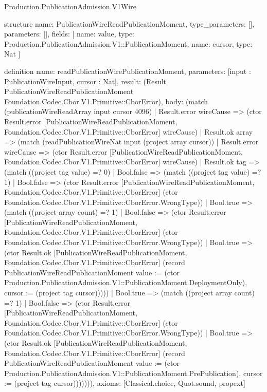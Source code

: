 \begin{lexlean}{Production.PublicationAdmission.V1Wire}
\begin{semanticmodule}
structure{
  name: PublicationWireReadPublicationMoment,
  type_parameters: [],
  parameters: [],
  fields: [
    {name: value, type: Production.PublicationAdmission.V1::PublicationMoment},
    {name: cursor, type: Nat}
  ]
}

definition{
  name: readPublicationWirePublicationMoment,
  parameters: [input : PublicationWireInput, cursor : Nat],
  result: (Result PublicationWireReadPublicationMoment Foundation.Codec.Cbor.V1.Primitive::CborError),
  body: (match (publicationWireReadArray input cursor 4096)
    | Result.error wireCause => (ctor Result.error [PublicationWireReadPublicationMoment, Foundation.Codec.Cbor.V1.Primitive::CborError] wireCause)
    | Result.ok array => (match (readPublicationWireNat input (project array cursor))
      | Result.error wireCause => (ctor Result.error [PublicationWireReadPublicationMoment, Foundation.Codec.Cbor.V1.Primitive::CborError] wireCause)
      | Result.ok tag => (match ((project tag value) =? 0)
        | Bool.false => (match ((project tag value) =? 1)
          | Bool.false => (ctor Result.error [PublicationWireReadPublicationMoment, Foundation.Codec.Cbor.V1.Primitive::CborError] (ctor Foundation.Codec.Cbor.V1.Primitive::CborError.WrongType))
          | Bool.true => (match ((project array count) =? 1)
            | Bool.false => (ctor Result.error [PublicationWireReadPublicationMoment, Foundation.Codec.Cbor.V1.Primitive::CborError] (ctor Foundation.Codec.Cbor.V1.Primitive::CborError.WrongType))
            | Bool.true => (ctor Result.ok [PublicationWireReadPublicationMoment, Foundation.Codec.Cbor.V1.Primitive::CborError] (record PublicationWireReadPublicationMoment {value := (ctor Production.PublicationAdmission.V1::PublicationMoment.DeploymentOnly), cursor := (project tag cursor)}))))
        | Bool.true => (match ((project array count) =? 1)
          | Bool.false => (ctor Result.error [PublicationWireReadPublicationMoment, Foundation.Codec.Cbor.V1.Primitive::CborError] (ctor Foundation.Codec.Cbor.V1.Primitive::CborError.WrongType))
          | Bool.true => (ctor Result.ok [PublicationWireReadPublicationMoment, Foundation.Codec.Cbor.V1.Primitive::CborError] (record PublicationWireReadPublicationMoment {value := (ctor Production.PublicationAdmission.V1::PublicationMoment.PrePublication), cursor := (project tag cursor)})))))),
  axioms: [Classical.choice, Quot.sound, propext]
}


\end{semanticmodule}
\end{lexlean}
